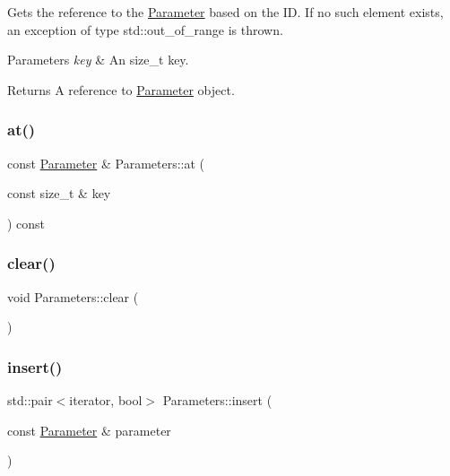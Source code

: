 Gets the reference to the \mbox{\hyperlink{class_parameter}{Parameter}} based on the ID. If no such element exists, an exception of type std\+::out\+\_\+of\+\_\+range is thrown.


\begin{DoxyParams}{Parameters}
{\em key} & An size\+\_\+t key. \\
\hline
\end{DoxyParams}
\begin{DoxyReturn}{Returns}
A reference to \mbox{\hyperlink{class_parameter}{Parameter}} object. 
\end{DoxyReturn}
\mbox{\label{class_parameters_aa52d49e7e5d0e112a90a3cd288c477ce}} 
\subsubsection{\texorpdfstring{at()}{at()}\hspace{0.1cm}{\footnotesize\ttfamily [2/2]}}
{\footnotesize\ttfamily const \mbox{\hyperlink{class_parameter}{Parameter}} \& Parameters\+::at (\begin{DoxyParamCaption}\item[{const size\+\_\+t \&}]{key }\end{DoxyParamCaption}) const}

\mbox{\label{class_parameters_a8992e16aa53bfe4423adfe08182e2507}} 
\subsubsection{\texorpdfstring{clear()}{clear()}}
{\footnotesize\ttfamily void Parameters\+::clear (\begin{DoxyParamCaption}{ }\end{DoxyParamCaption})\hspace{0.3cm}{\ttfamily [noexcept]}}

\mbox{\label{class_parameters_ab643a6115d93d3142247f4a3ecf79d59}} 
\subsubsection{\texorpdfstring{insert()}{insert()}}
{\footnotesize\ttfamily std\+::pair$<$iterator, bool$>$ Parameters\+::insert (\begin{DoxyParamCaption}\item[{const \mbox{\hyperlink{class_parameter}{Parameter}} \&}]{parameter }\end{DoxyParamCaption})\hspace{0.3cm}{\ttfamily [inline]}}

